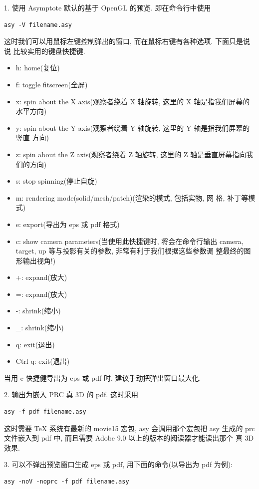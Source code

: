 \documentclass{ctexbook}
\begin{document}
1. 使用 Asymptote 默认的基于 OpenGL 的预览. 即在命令行中使用
\begin{verbatim}
asy -V filename.asy
\end{verbatim}

这时我们可以用鼠标左键控制弹出的窗口, 而在鼠标右键有各种选项. 下面只是说说
比较实用的键盘快捷键.

\begin{itemize}
\item h: home(复位)
\item f: toggle fitscreen(全屏)
\item x: spin about the X axis(观察者绕着 X 轴旋转, 这里的 X 轴是指我们屏幕的
  水平方向)
\item y: spin about the Y axis(观察者绕着 Y 轴旋转, 这里的 Y 轴是指我们屏幕的竖直
  方向)
\item z: spin about the Z axis(观察者绕着 Z 轴旋转, 这里的 Z 轴是垂直屏幕指向我
  们的方向)
\item s: stop spinning(停止自旋)
\item m: rendering mode(solid/mesh/patch)(渲染的模式, 包括实物, 网
  格, 补丁等模式)
\item e: export(导出为 eps 或 pdf 格式)
\item c: show camera parameters(当使用此快捷键时, 将会在命令行输出
  camera, target, up 等与投影有关的参数, 非常有利于我们根据这些参数调
  整最终的图形输出视角!)
\item +: expand(放大)
\item =: expand(放大)
\item -: shrink(缩小)
\item \_: shrink(缩小)
\item q: exit(退出)
\item Ctrl-q: exit(退出)
\end{itemize}
当用 e 快捷健导出为 eps 或 pdf 时, 建议手动把弹出窗口最大化.

2. 输出为嵌入 PRC 真 3D 的 pdf. 这时采用
\begin{verbatim}
asy -f pdf filename.asy
\end{verbatim}

这时需要 TeX 系统有最新的 movie15 宏包, asy 会调用那个宏包把 asy 生成的
prc 文件嵌入到 pdf 中, 而且需要 Adobe 9.0 以上的版本的阅读器才能读出那个
真 3D 效果.

3.  可以不弹出预览窗口生成 eps 或 pdf, 用下面的命令(以导出为 pdf 为例):
\begin{verbatim}
asy -noV -noprc -f pdf filename.asy
\end{verbatim}
\end{document}
